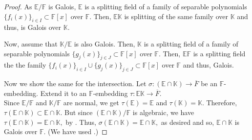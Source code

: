 \galoisEFK*\label{prop:galoisEFK2}
\begin{flushright}\hyperref[prop:galoisEFK]{\upsym}\end{flushright}
\begin{proof}
    As $\mathbb{E}/\mathbb{F}$ is Galois, $\mathbb{E}$ is a splitting field of a family of separable polynomials $\{f_i(x)\}_{i \in I} \subset \mathbb{F}[x]$ over $\mathbb{F}.$ Then, $\mathbb{E}\mathbb{K}$ is splitting of the same family over $\mathbb{K}$ and thus, is Galois over $\mathbb{K}.$

    Now, assume that $\mathbb{K}/\mathbb{E}$ is also Galois. Then, $\mathbb{K}$ is a splitting field of a family of separable polynomials $\{g_j(x)\}_{j \in J} \subset \mathbb{F}[x]$ over $\mathbb{F}.$ Then, $\mathbb{E}\mathbb{F}$ is a splitting field the the family $\{f_i(x)\}_{i \in I} \cup \{g_j(x)\}_{j \in J} \subset \mathbb{F}[x]$ over $\mathbb{F}$ and thus, Galois.

    Now we show the same for the intersection. Let $\sigma : (\mathbb{E} \cap \mathbb{K}) \to \overline{F}$ be an $\mathbb{F}$-embedding. Extend it to an $\mathbb{F}$-embedding $\tau : \mathbb{E}\mathbb{K} \to \overline{F}.$\\
    Since $\mathbb{E}/\mathbb{F}$ and $\mathbb{K}/\mathbb{F}$ are normal, we get $\tau(\mathbb{E}) = \mathbb{E}$ and $\tau(\mathbb{K}) = \mathbb{K}.$ Therefore, $\tau(\mathbb{E} \cap \mathbb{K}) \subset \mathbb{E} \cap \mathbb{K}.$ But since $(\mathbb{E} \cap \mathbb{K})/\mathbb{F}$ is algebraic, we have $\tau(\mathbb{E} \cap \mathbb{K}) = \mathbb{E} \cap \mathbb{K},$ by . Thus, $\sigma(\mathbb{E} \cap \mathbb{K}) = \mathbb{E} \cap \mathbb{K},$ as desired and so, $\mathbb{E} \cap \mathbb{K}$ is Galois over $\mathbb{F}.$ (We have used .)
\end{proof}


